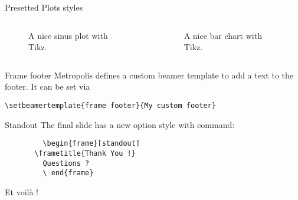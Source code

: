 	\begin{frame}{Presetted Plots styles}
		\begin{columns}[T,onlytextwidth]
			\begin{figure}
				\caption{A nice sinus plot with Tikz.}
			\end{figure}

			\begin{figure}
				\caption{A nice bar chart with Tikz.}
			\end{figure}
		\end{columns}
	\end{frame}

	{%
	\begin{frame}[fragile]{Frame footer}
	   Metropolis defines a custom beamer template to add a text to the footer. It can be set via
	   \begin{verbatim}\setbeamertemplate{frame footer}{My custom footer}\end{verbatim}
	\end{frame}
	}

	\begin{frame}[fragile]{Standout}
		The final slide has a new option style with command:
		\begin{verbatim}
		 \begin{frame}[standout]
	   \frametitle{Thank You !}
	     Questions ?
		 \ end{frame}
		\end{verbatim}

		\begin{center}
			Et voilà !
		\end{center}
	\end{frame}

